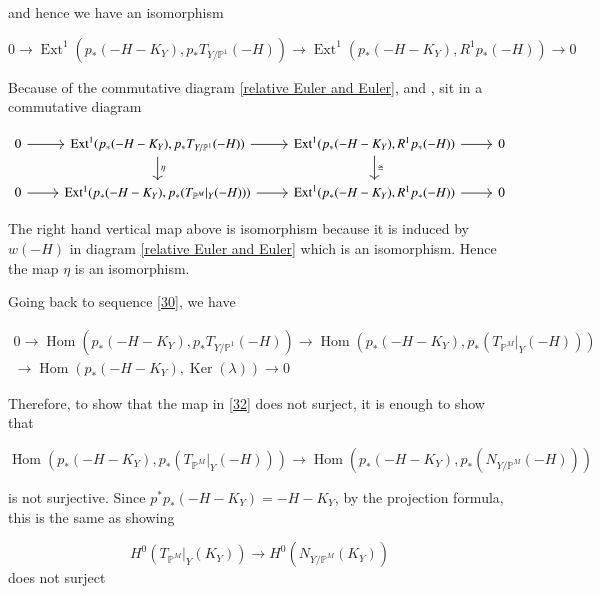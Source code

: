\documentclass[11pt,twoside]{amsart}
\theoremstyle{plain}
\numberwithin{equation}{section}
\theoremstyle{definition}
\begin{document}
\color{black}
and hence we have an isomorphism 

\begin{equation}\label{top hor}
 0 \to \operatorname{Ext}^1(p_*(-H-K_Y), p_*T_{Y/\mathbb{P}^1}(-H)) \to \operatorname{Ext}^1(p_*(-H-K_Y), R^1p_*(-H)) \to 0 
\end{equation}

Because of the commutative diagram \ref{relative Euler and Euler},  
 and , sit in a commutative diagram

\[
\begin{tikzcd}
0 \arrow[r] & \operatorname{Ext}^1(p_*(-H-K_Y), p_*T_{Y/\mathbb{P}^1}(-H)) \arrow[d, "\eta"] \arrow[r] & \operatorname{Ext}^1(p_*(-H-K_Y), R^1p_*(-H)) \arrow[r] \arrow[d, "\cong"] & 0 \\
0 \arrow[r] & \operatorname{Ext^1}(p_*(-H-K_Y), 
 p_*(T_{\mathbb{P}^M}|_Y(-H))) \arrow[r] & \operatorname{Ext}^1(p_*(-H-K_Y), R^1p_*(-H)) \arrow[r] & 0
\end{tikzcd}
\]

The right hand vertical map above is isomorphism because it is induced by $w(-H)$ in diagram \ref{relative Euler and Euler} which is an isomorphism. Hence the map $\eta$ is an isomorphism.

\color{black}
Going back to sequence \ref{30}, we have 

\begin{multline}\label{31}
0 \to \operatorname{Hom}(p_*(-H-K_Y), 
 p_*T_{Y/\mathbb{P}^1}(-H))  \to \operatorname{Hom}(p_*(-H-K_Y), p_*(T_{\mathbb{P}^M}|_Y(-H))) \\ \to \operatorname{Hom}(p_*(-H-K_Y),\operatorname{Ker}(\lambda)) \to 0
\end{multline}

Therefore, to show that the map in \ref{32} does not surject, it is enough to show that

\begin{equation}\label{33}
  \operatorname{Hom}(p_*(-H-K_Y), p_*(T_{\mathbb{P}^M}|_Y(-H))) \to \operatorname{Hom}(p_*(-H-K_Y), p_*(N_{Y/\mathbb{P}^M}(-H)))  
\end{equation}

is not surjective. Since $p^*p_*(-H-K_Y) = -H-K_Y$, by the projection formula, this is the same as showing 

\begin{equation}\label{34}
   H^0(T_{\mathbb{P}^M}|_Y(K_Y)) \to H^0(N_{Y/\mathbb{P}^M}(K_Y)) 
\end{equation}
does not surject
\end{document}
